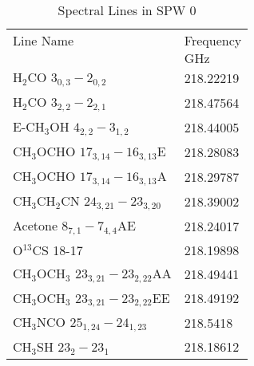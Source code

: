\begin{table*}[htp]
\caption{Spectral Lines in SPW 0}
\begin{tabular}{ll}
\label{tab:linesspw0}
Line Name & Frequency \\
 & $\mathrm{GHz}$ \\
\hline
H$_2$CO $3_{0,3}-2_{0,2}$ & 218.22219 \\
H$_2$CO $3_{2,2}-2_{2,1}$ & 218.47564 \\
E-CH$_3$OH $4_{2,2}-3_{1,2}$ & 218.44005 \\
CH$_3$OCHO $17_{3,14}-16_{3,13}$E & 218.28083 \\
CH$_3$OCHO $17_{3,14}-16_{3,13}$A & 218.29787 \\
CH$_3$CH$_2$CN $24_{3,21}-23_{3,20}$ & 218.39002 \\
Acetone $8_{7,1}-7_{4,4}$AE & 218.24017 \\
O$^{13}$CS 18-17 & 218.19898 \\
CH$_3$OCH$_3$ $23_{3,21}-23_{2,22}$AA & 218.49441 \\
CH$_3$OCH$_3$ $23_{3,21}-23_{2,22}$EE & 218.49192 \\
CH$_3$NCO $25_{1,24} - 24_{1,23}$ & 218.5418 \\
CH$_3$SH $23_2-23_1$ & 218.18612 \\
\hline
\end{tabular}

\end{table*}
